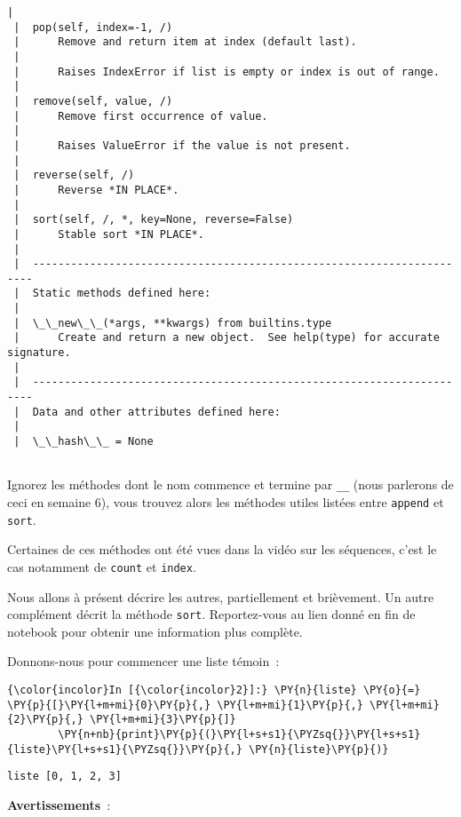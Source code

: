 \begin{Verbatim}[commandchars=\\\{\}]
 |  
 |  pop(self, index=-1, /)
 |      Remove and return item at index (default last).
 |      
 |      Raises IndexError if list is empty or index is out of range.
 |  
 |  remove(self, value, /)
 |      Remove first occurrence of value.
 |      
 |      Raises ValueError if the value is not present.
 |  
 |  reverse(self, /)
 |      Reverse *IN PLACE*.
 |  
 |  sort(self, /, *, key=None, reverse=False)
 |      Stable sort *IN PLACE*.
 |  
 |  ----------------------------------------------------------------------
 |  Static methods defined here:
 |  
 |  \_\_new\_\_(*args, **kwargs) from builtins.type
 |      Create and return a new object.  See help(type) for accurate signature.
 |  
 |  ----------------------------------------------------------------------
 |  Data and other attributes defined here:
 |  
 |  \_\_hash\_\_ = None


    \end{Verbatim}

    Ignorez les méthodes dont le nom commence et termine par \texttt{\_\_}
(nous parlerons de ceci en semaine 6), vous trouvez alors les méthodes
utiles listées entre \texttt{append} et \texttt{sort}.

Certaines de ces méthodes ont été vues dans la vidéo sur les séquences,
c'est le cas notamment de \texttt{count} et \texttt{index}.

    Nous allons à présent décrire les autres, partiellement et brièvement.
Un autre complément décrit la méthode \texttt{sort}. Reportez-vous au
lien donné en fin de notebook pour obtenir une information plus
complète.

    Donnons-nous pour commencer une liste témoin~:

    \begin{Verbatim}[commandchars=\\\{\}]
{\color{incolor}In [{\color{incolor}2}]:} \PY{n}{liste} \PY{o}{=} \PY{p}{[}\PY{l+m+mi}{0}\PY{p}{,} \PY{l+m+mi}{1}\PY{p}{,} \PY{l+m+mi}{2}\PY{p}{,} \PY{l+m+mi}{3}\PY{p}{]}
        \PY{n+nb}{print}\PY{p}{(}\PY{l+s+s1}{\PYZsq{}}\PY{l+s+s1}{liste}\PY{l+s+s1}{\PYZsq{}}\PY{p}{,} \PY{n}{liste}\PY{p}{)}
\end{Verbatim}


    \begin{Verbatim}[commandchars=\\\{\}]
liste [0, 1, 2, 3]

    \end{Verbatim}

    \textbf{Avertissements}~:

